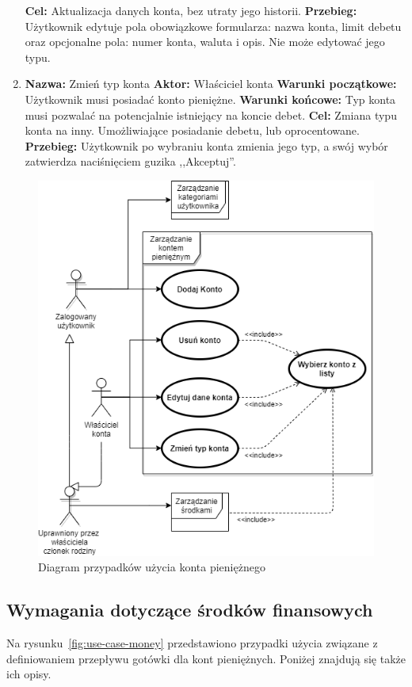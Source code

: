 \begin{enumerate}[labelwidth=1em,label=\arabic*.]
    \textbf{Cel:} Aktualizacja danych konta, bez utraty jego historii. \newline
    \textbf{Przebieg:} Użytkownik edytuje pola obowiązkowe formularza: nazwa konta, limit debetu oraz opcjonalne pola: numer konta, waluta i opis. Nie może edytować jego typu.
\item \label{last-item1}\textbf{Nazwa:} Zmień typ konta\newline
    \textbf{Aktor:} Właściciel konta \newline
    \textbf{Warunki początkowe:} Użytkownik musi posiadać konto pieniężne. \newline
    \textbf{Warunki końcowe:} Typ konta musi pozwalać na potencjalnie istniejący na koncie debet. \newline
    \textbf{Cel:} Zmiana typu konta na inny. Umożliwiające posiadanie debetu, lub oprocentowane. \newline
    \textbf{Przebieg:} Użytkownik po wybraniu konta zmienia jego typ, a swój wybór zatwierdza naciśnięciem guzika ,,Akceptuj''. 
\end{enumerate}

\begin{figure}[t]
	\centering
	\includegraphics[width=.65\linewidth]{rys03/use-case-account.png}
	\caption{Diagram przypadków użycia konta pieniężnego}
	\label{fig:use-case-account}
\end{figure}

\subsection{Wymagania dotyczące środków finansowych}
\label{subsec:wymagania-srodki-finansowe}
Na rysunku~\ref{fig:use-case-money} przedstawiono przypadki użycia związane z definiowaniem przepływu gotówki dla kont pieniężnych. Poniżej znajdują się także ich opisy.

